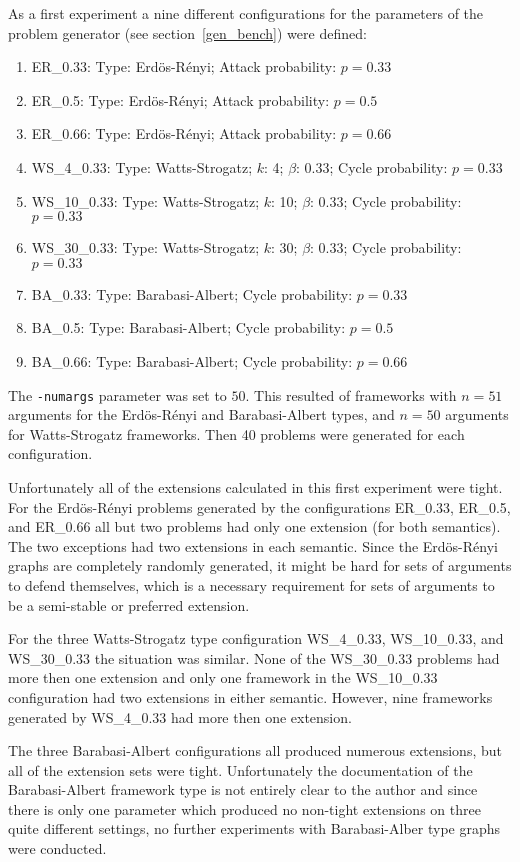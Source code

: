 \documentclass[parskip=half]{scrartcl}
\begin{document}
As a first experiment a nine different configurations for the parameters of the
problem generator (see section~\ref{gen_bench}) were defined:
\begin{enumerate}
  \item ER\_0.33: Type: Erdös-Rényi; Attack probability: $p=0.33$
  \item ER\_0.5: Type: Erdös-Rényi; Attack probability: $p=0.5$
  \item ER\_0.66: Type: Erdös-Rényi; Attack probability: $p=0.66$
  \item WS\_4\_0.33: Type: Watts-Strogatz; $k$: 4; $\beta$: 0.33; Cycle probability: $p=0.33$
  \item WS\_10\_0.33: Type: Watts-Strogatz; $k$: 10; $\beta$: 0.33; Cycle probability: $p=0.33$
  \item WS\_30\_0.33: Type: Watts-Strogatz; $k$: 30; $\beta$: 0.33; Cycle probability: $p=0.33$
  \item BA\_0.33: Type: Barabasi-Albert; Cycle probability: $p=0.33$
  \item BA\_0.5: Type: Barabasi-Albert; Cycle probability: $p=0.5$
  \item BA\_0.66: Type: Barabasi-Albert; Cycle probability: $p=0.66$
\end{enumerate}
The \texttt{-numargs} parameter was set to $50$. This resulted of frameworks
with $n=51$ arguments for the Erdös-Rényi and Barabasi-Albert types, and $n=50$
arguments for Watts-Strogatz frameworks. Then 40 problems were generated for
each configuration.

Unfortunately all of the extensions calculated in this first experiment were
tight. For the Erdös-Rényi problems generated by the configurations ER\_0.33,
ER\_0.5, and ER\_0.66 all but two problems had only one extension (for both
semantics). The two exceptions had two extensions in each semantic. Since the
Erdös-Rényi graphs are completely randomly generated, it might be hard for sets
of arguments to defend themselves, which is a necessary requirement for sets of
arguments to be a semi-stable or preferred extension.

For the three Watts-Strogatz type configuration WS\_4\_0.33, WS\_10\_0.33, and
WS\_30\_0.33 the situation was similar. None of the WS\_30\_0.33 problems had
more then one extension and only one framework in the WS\_10\_0.33 configuration
had two extensions in either semantic.  However, nine frameworks generated by
WS\_4\_0.33 had more then one extension.

The three Barabasi-Albert configurations all produced numerous extensions, but
all of the extension sets were tight. Unfortunately the documentation of the
Barabasi-Albert framework type is not entirely clear to the author and since
there is only one parameter which produced no non-tight extensions on three
quite different settings, no further experiments with Barabasi-Alber type
graphs were conducted.
\end{document}
